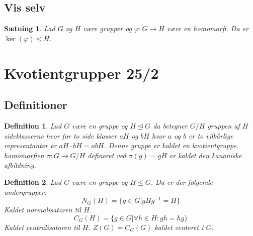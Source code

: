 \documentclass{article}
\newcommand{\inv}{^{-1}}
\newcommand{\too}{\rightarrow}
\newtheorem{setn}{Sætning}
\newtheorem{defi}{Definition}
\begin{document}
		\subsection*{Vis selv}
		\begin{setn}
			Lad $G$ og $H$ være grupper og $\varphi: G \too H$ være en homomorfi.
			Da er $\ker(\varphi) \unlhd H$.
		\end{setn}
	\newpage
	\section*{Kvotientgrupper 25/2}
		\subsection*{Definitioner}
		\begin{defi}
			Lad $G$ være en gruppe og $H \unlhd G$ da betegner $G/H$ gruppen
			af $H$ sideklasserne hvor for to side klasser $aH$ og $bH$ hvor $a$ og $b$
			er to vilkårlige representanter er $aH\cdot bH = abH$. Denne gruppe er kaldet
			en kvotientgruppe.
			homomorfien $\pi: G \too G/H$ defineret ved $\pi(g) = gH$ er kaldet
			den kanoniske afbildning.
		\end{defi}
		\begin{defi}
			Lad $G$ være en gruppe og $H \le G$. Da er der følgende undergrupper:
			$$N_G(H) = \{g \in G| gHg\inv = H\}$$
			Kaldet normalisatoren til $H$.
			$$C_G(H) = \{g \in G| \forall h \in H: gh = hg\}$$
			Kaldet centralisatoren til $H$.
			$Z(G) = C_G(G)$ kaldet centeret i $G$.
		\end{defi}
\end{document}
